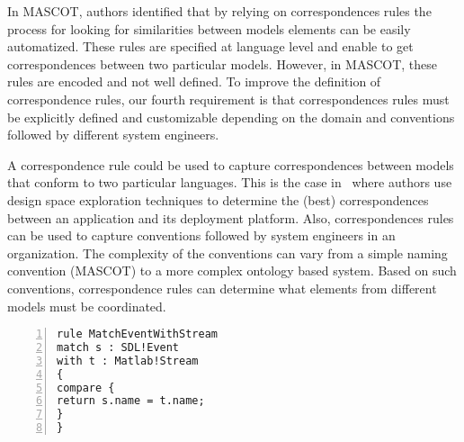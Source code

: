 	
	
	


In MASCOT, authors identified that by relying on correspondences rules the process for looking for similarities between models elements can be easily automatized. These rules are specified at language level and enable to get correspondences between two particular models. However, in MASCOT, these rules are encoded and not well defined. To improve the definition of correspondence rules, our fourth requirement is that correspondences rules must be explicitly defined and customizable depending on the domain and conventions followed by different system engineers.
	
A correspondence rule could be used to capture correspondences between models that conform to two particular languages. This is the case in~\cite{kofmanbib} where authors use design space exploration techniques to determine the (best) correspondences between an application and its deployment platform. Also, correspondences rules can be used to capture conventions followed by system engineers in an organization. The complexity of the conventions can vary from a simple naming convention (\eg MASCOT) to a more complex ontology based system. Based on such conventions, correspondence rules can determine what elements from different models must be coordinated.    

\begin{lstlisting}[language=epsilon, caption={The Mascot correspondence rule in the Epsilon Comparison Language}, label={lst:epsilon}, 	basicstyle=\scriptsize\ttfamily, backgroundcolor=\color{LGrey}, numbers=left, xleftmargin=2pt]
rule MatchEventWithStream
match s : SDL!Event
with t : Matlab!Stream 
{
compare {
return s.name = t.name;
}
}
\end{lstlisting}

